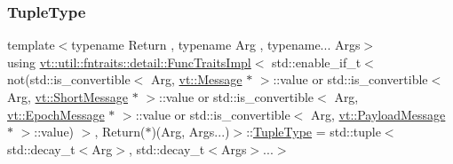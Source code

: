 \subsubsection{\texorpdfstring{Tuple\+Type}{TupleType}}
{\footnotesize\ttfamily template$<$typename Return , typename Arg , typename... Args$>$ \\
using \hyperlink{structvt_1_1util_1_1fntraits_1_1detail_1_1_func_traits_impl}{vt\+::util\+::fntraits\+::detail\+::\+Func\+Traits\+Impl}$<$ std\+::enable\+\_\+if\+\_\+t$<$ not(std\+::is\+\_\+convertible$<$ Arg, \hyperlink{namespacevt_a3a3ddfef40b4c90915fa43cdd5f129ea}{vt\+::\+Message} $\ast$ $>$\+::value or std\+::is\+\_\+convertible$<$ Arg, \hyperlink{namespacevt_a1125ac1da6c0bbf141e0ea0739d7602d}{vt\+::\+Short\+Message} $\ast$ $>$\+::value or std\+::is\+\_\+convertible$<$ Arg, \hyperlink{namespacevt_ad67368ffae52d7325002586b41bb150e}{vt\+::\+Epoch\+Message} $\ast$ $>$\+::value or std\+::is\+\_\+convertible$<$ Arg, \hyperlink{namespacevt_a89a92229c5622b855c02c549f83a1a68}{vt\+::\+Payload\+Message} $\ast$ $>$\+::value) $>$, Return($\ast$)(Arg, Args...)$>$\+::\hyperlink{structvt_1_1util_1_1fntraits_1_1detail_1_1_func_traits_impl_3_01std_1_1enable__if__t_3_01not_07s3fd5866f31025a6fa1e7500192630846_aff63cb59848ab7b280d359b08b3e280e}{Tuple\+Type} =  std\+::tuple$<$std\+::decay\+\_\+t$<$Arg$>$, std\+::decay\+\_\+t$<$Args$>$...$>$}



